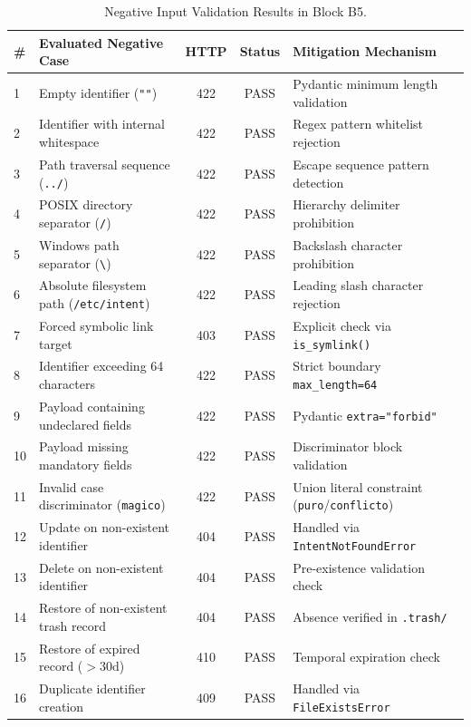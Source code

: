 \documentclass[11pt,a4paper]{article}
\begin{document}
\begin{table}[H]
\centering
\small
\begin{tabularx}{\textwidth}{llccX}
\toprule
\textbf{\#} & \textbf{Evaluated Negative Case} & \textbf{HTTP} & \textbf{Status} & \textbf{Mitigation Mechanism} \\
\midrule
1 & Empty identifier (\texttt{""}) & 422 & PASS & Pydantic minimum length validation \\
2 & Identifier with internal whitespace & 422 & PASS & Regex pattern whitelist rejection \\
3 & Path traversal sequence (\texttt{../}) & 422 & PASS & Escape sequence pattern detection \\
4 & POSIX directory separator (\texttt{/}) & 422 & PASS & Hierarchy delimiter prohibition \\
5 & Windows path separator (\texttt{\textbackslash}) & 422 & PASS & Backslash character prohibition \\
6 & Absolute filesystem path (\texttt{/etc/intent}) & 422 & PASS & Leading slash character rejection \\
7 & Forced symbolic link target & 403 & PASS & Explicit check via \texttt{is\_symlink()} \\
8 & Identifier exceeding 64 characters & 422 & PASS & Strict boundary \texttt{max\_length=64} \\
9 & Payload containing undeclared fields & 422 & PASS & Pydantic \texttt{extra="forbid"} \\
10 & Payload missing mandatory fields & 422 & PASS & Discriminator block validation \\
11 & Invalid case discriminator (\texttt{magico}) & 422 & PASS & Union literal constraint (\texttt{puro}/\texttt{conflicto}) \\
12 & Update on non-existent identifier & 404 & PASS & Handled via \texttt{IntentNotFoundError} \\
13 & Delete on non-existent identifier & 404 & PASS & Pre-existence validation check \\
14 & Restore of non-existent trash record & 404 & PASS & Absence verified in \texttt{.trash/} \\
15 & Restore of expired record ($>30\text{d}$) & 410 & PASS & Temporal expiration check \\
16 & Duplicate identifier creation & 409 & PASS & Handled via \texttt{FileExistsError} \\
\bottomrule
\end{tabularx}
\caption{Negative Input Validation Results in Block B5.}
\label{tab:casos_negativos_en}
\end{table}
\end{document}
